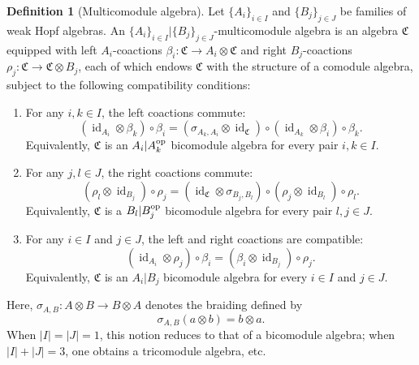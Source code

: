 \documentclass[a4paper,11pt]{article}
\theoremstyle{definition}
\newtheorem{definition}[theorem]{Definition}
\theoremstyle{remark}
\newcommand{\id}{\operatorname{id}}
\begin{document}
\begin{definition}[Multicomodule algebra]
Let $\{A_i\}_{i\in I}$ and $\{B_j\}_{j\in J}$ be families of weak Hopf algebras. An \(\{A_i\}_{i\in I}\vert\{B_j\}_{j\in J}\)-multicomodule algebra is an algebra $\mathfrak{C}$ equipped with left $A_i$-coactions $\beta_i:\mathfrak{C}\to A_i\otimes \mathfrak{C}$ and right $B_j$-coactions $\rho_j:\mathfrak{C}\to \mathfrak{C}\otimes B_j$, each of which endows $\mathfrak{C}$ with the structure of a comodule algebra, subject to the following compatibility conditions:
\begin{enumerate}
    \item For any $i,k\in I$, the left coactions commute:
    \begin{equation}
        (\id_{A_i}\otimes \beta_k)\circ \beta_i
        =
        (\sigma_{A_k,A_i}\otimes \id_{\mathfrak{C}})
        \circ
        (\id_{A_k}\otimes \beta_i)
        \circ
        \beta_k.
    \end{equation}
    Equivalently, $\mathfrak{C}$ is an $A_i|A_k^{\rm op}$ bicomodule algebra for every pair $i,k\in I$.

    \item For any $j,l\in J$, the right coactions commute:
    \begin{equation}
        (\rho_l\otimes \id_{B_j})\circ \rho_j
        =
        (\id_{\mathfrak{C}}\otimes \sigma_{B_j,B_l})
        \circ
        (\rho_j\otimes \id_{B_l})
        \circ
        \rho_l.
    \end{equation}
    Equivalently, $\mathfrak{C}$ is a $B_l|B_j^{\rm op}$ bicomodule algebra for every pair $l,j\in J$.

    \item For any $i\in I$ and $j\in J$, the left and right coactions are compatible:
    \begin{equation}
        (\id_{A_i}\otimes \rho_j)\circ \beta_i
        =
        (\beta_i\otimes \id_{B_j})\circ \rho_j.
    \end{equation}
    Equivalently, $\mathfrak{C}$ is an $A_i|B_j$ bicomodule algebra for every $i\in I$ and $j\in J$.
\end{enumerate}
Here, $\sigma_{A,B}:A\otimes B\to B\otimes A$ denotes the braiding defined by
\begin{equation}
    \sigma_{A,B}(a\otimes b)=b\otimes a.
\end{equation}
When $|I|=|J|=1$, this notion reduces to that of a bicomodule algebra; when $|I|+|J|=3$, one obtains a tricomodule algebra, etc.
\end{definition}
\end{document}
